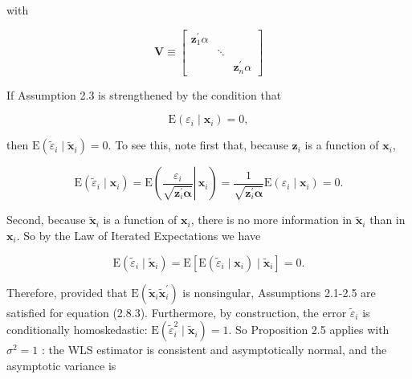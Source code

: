 \documentclass[10pt]{article}
\begin{document}
with

$$
\mathbf{V} \equiv\left[\begin{array}{ccc}
\mathbf{z}_{1}^{\prime} \alpha & & \\
& \ddots & \\
& & \mathbf{z}_{n}^{\prime} \alpha
\end{array}\right]
$$

If Assumption 2.3 is strengthened by the condition that


\begin{equation*}
\mathrm{E}\left(\varepsilon_{i} \mid \mathbf{x}_{i}\right)=0, \tag{2.8.5}
\end{equation*}


then $\mathrm{E}\left(\tilde{\varepsilon}_{i} \mid \tilde{\mathbf{x}}_{i}\right)=0$. To see this, note first that, because $\mathbf{z}_{i}$ is a function of $\mathbf{x}_{i}$,


\begin{equation*}
\mathrm{E}\left(\tilde{\varepsilon}_{i} \mid \mathbf{x}_{i}\right)=\mathrm{E}\left(\left.\frac{\varepsilon_{i}}{\sqrt{\mathbf{z}_{i}^{\prime} \boldsymbol{\alpha}}} \right\rvert\, \mathbf{x}_{i}\right)=\frac{1}{\sqrt{\mathbf{z}_{i}^{\prime} \boldsymbol{\alpha}}} \mathrm{E}\left(\varepsilon_{i} \mid \mathbf{x}_{i}\right)=0 . \tag{2.8.6}
\end{equation*}


Second, because $\tilde{\mathbf{x}}_{i}$ is a function of $\mathbf{x}_{i}$, there is no more information in $\tilde{\mathbf{x}}_{i}$ than in $\mathbf{x}_{i}$. So by the Law of Iterated Expectations we have

$$
\mathrm{E}\left(\tilde{\varepsilon}_{i} \mid \tilde{\mathbf{x}}_{i}\right)=\mathrm{E}\left[\mathrm{E}\left(\tilde{\varepsilon}_{i} \mid \mathbf{x}_{i}\right) \mid \tilde{\mathbf{x}}_{i}\right]=0 .
$$

Therefore, provided that $\mathrm{E}\left(\tilde{\mathbf{x}}_{i} \tilde{\mathbf{x}}_{i}^{\prime}\right)$ is nonsingular, Assumptions 2.1-2.5 are satisfied for equation (2.8.3). Furthermore, by construction, the error $\tilde{\varepsilon}_{i}$ is conditionally homoskedastic: $\mathrm{E}\left(\tilde{\varepsilon}_{i}^{2} \mid \tilde{\mathbf{x}}_{i}\right)=1$. So Proposition 2.5 applies with $\sigma^{2}=1$ : the WLS estimator is consistent and asymptotically normal, and the asymptotic variance is
\end{document}
